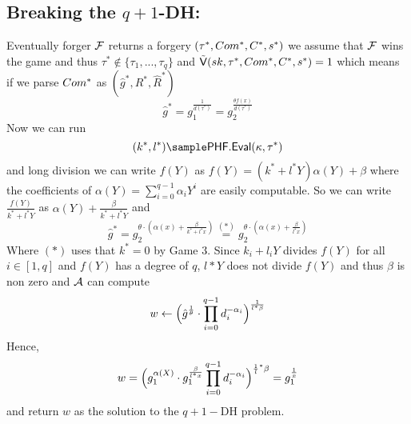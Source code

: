 \subsection*{Breaking the $q+1$-DH:}
Eventually forger $\mathcal{F}$ returns a forgery $(\tau^*,Com^*,C^*,s^*)$ we assume that $\mathcal{F}$ wins the game and thus $\tau^* \notin \{\tau_1,...,\tau_q\}$ and 
$\tilde{\mathsf{V}}(sk, \tau^*,Com^*,C^*,s^*) = 1$ which means if we parse $Com^*$ as $(\hat{g}^*,R^*,\hat{R}^*)$
$$\hat{g}^* = g_1^{\frac{1}{d(\tau^*)}} = g_2^{\frac{\theta f(x)}{d(\tau^*)}}$$
Now we can run 
$$(k^*,l^*) \sample \phfEval(\kappa, \tau^*)$$
and long division we can write $f(Y)$ as $f(Y) = (k^*+l^*Y)\alpha(Y) + \beta$  where the coefficients of $\alpha(Y) = \sum_{i=0}^{q-1} \alpha_iY^i$ are easily computable. So we can write $\frac{f(Y)}{k^*+l^*Y}$ as $\alpha(Y) + \frac{\beta}{k^*+l^*Y}$ and 
$$\hat{g}^* = g_2^{\theta\cdot(\alpha(x) + \frac{\beta}{k^*+l^*x})} \stackrel{(*)}{=} g_2^{\theta\cdot(\alpha(x) + \frac{\beta}{l^*x})}$$
Where $(*)$ uses that $k^* = 0$ by Game 3.
Since $k_i +l_iY$ divides $f(Y)$ for all $i\in [1,q]$ and $f(Y)$ has a degree of $q$, $l*Y$ does not divide $f(Y)$ and thus $\beta$ is non zero and $\mathcal{A}$ can compute
$$w \leftarrow \Big{(} \hat{g}^{\frac{1}{\theta}} \cdot \prod_{i=0}^{q-1} d_i^{-\alpha_i}\Big{)}^{\frac{1}{l^*\beta}}$$
Hence,
$$w =\Big{(} g_1^{\alpha(X)}\cdot g_1^{\frac{\beta}{l^*x}}  \prod_{i=0}^{q-1} d_i^{-\alpha_i}\Big{)}^{\frac{1}l^*{\beta }} = g_1^{\frac{1}{x}}$$
and return $w$ as the solution to the  $q+1-$DH problem.

